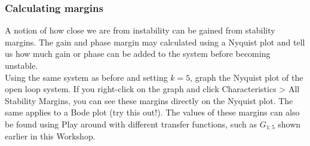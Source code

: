 \documentclass[9pt]{beamer-control}
\begin{document}
\begin{frame}[fragile]
  \frametitle{Calculating margins}
  A notion of how close we are from instability can be gained from stability margins. The gain and phase margin may calculated using a Nyquist plot and tell us how much gain or phase can be added to the system before becoming unstable.\\[10pt]

  Using the same system as before and setting $k=5$, graph the Nyquist plot of the open loop system. If you right-click on the graph and click Characteristics > All Stability Margins, you can see these margins directly on the Nyquist plot. The same applies to a Bode plot (try this out!). The values of these margins can also be found using
  Play around with different transfer functions, such as $G_{1:5}$ shown earlier in this Workshop.

\end{frame}
\end{document}

